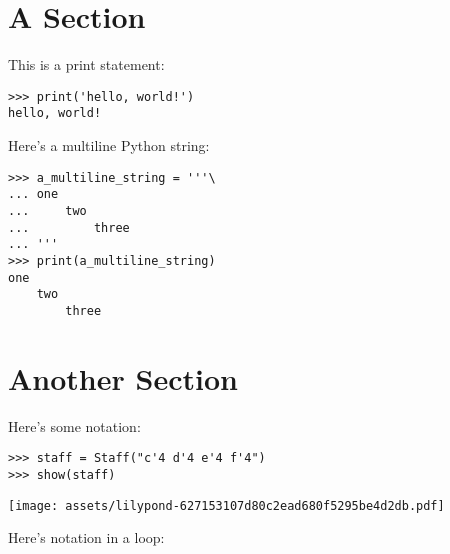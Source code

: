 \documentclass{article}
\begin{document}
\section{A Section}

This is a print statement:

\begin{comment}
<abjad>
print('hello, world!')
</abjad>
\end{comment}

\begin{lstlisting}
>>> print('hello, world!')
hello, world!
\end{lstlisting}

Here's a multiline Python string:

\begin{comment}
<abjad>
a_multiline_string = '''\
one
    two
        three
'''
print(a_multiline_string)
</abjad>
\end{comment}

\begin{lstlisting}
>>> a_multiline_string = '''\
... one
...     two
...         three
... '''
>>> print(a_multiline_string)
one
    two
        three
\end{lstlisting}

\section{Another Section}

Here's some notation:

\begin{comment}
<abjad>
staff = Staff("c'4 d'4 e'4 f'4")
show(staff)
</abjad>
\end{comment}

\begin{lstlisting}
>>> staff = Staff("c'4 d'4 e'4 f'4")
>>> show(staff)
\end{lstlisting}
\noindent\texttt{[image: assets/lilypond-627153107d80c2ead680f5295be4d2db.pdf]}

Here's notation in a loop:

\begin{comment}
<abjad>
for leaf in staff.select_leaves():
    duration = inspect_(leaf).get_duration()
    print(duration)
    show(leaf)

</abjad>
\end{comment}
\end{document}

